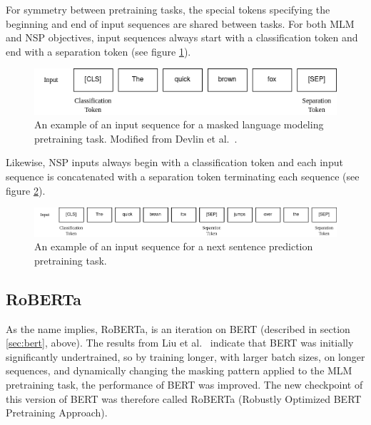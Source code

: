 \documentclass[12pt]{article}
\begin{document}
For symmetry between pretraining tasks, the special tokens specifying the beginning and end of input sequences are shared between tasks. For both MLM
and NSP objectives, input sequences always start with a classification token and end with a separation token (see figure \ref{fig:bert_mlm_input_example}).

\begin{figure}[h!]
    \includegraphics[width=\linewidth]{figures/BERT_MLM_input.png}
    \caption{An example of an input sequence for a masked language modeling pretraining task. Modified from Devlin et al.~\cite{devlin_bert_2019}.}
    \label{fig:bert_mlm_input_example}
\end{figure}

\noindent
Likewise, NSP inputs always begin with a classification token and each input sequence is concatenated with a separation token terminating each
sequence (see figure \ref{fig:bert_nsp_input_example}).

\begin{figure}[h!]
    \includegraphics[width=\linewidth]{figures/BERT_NSP_input.png}
    \caption{An example of an input sequence for a next sentence prediction pretraining task.}
    \label{fig:bert_nsp_input_example}
\end{figure}



\subsection{RoBERTa}\label{sec:roberta}
As the name implies, RoBERTa, is an iteration on BERT (described in section \ref{sec:bert}, above). The results from
Liu et al.~\cite{liu_roberta_2019} indicate that BERT was initially significantly undertrained, so by training longer, with larger batch sizes, on
longer sequences, and dynamically changing the masking pattern applied to the MLM pretraining task, the performance of BERT was improved. The new
checkpoint of this version of BERT was therefore called RoBERTa (Robustly Optimized BERT Pretraining Approach).
\end{document}
